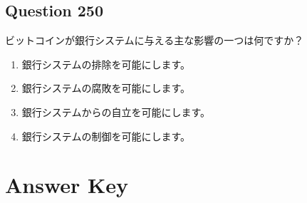 \documentclass[12pt,a4paper]{article}
\begin{document}
\subsection*{Question 250}
ビットコインが銀行システムに与える主な影響の一つは何ですか？

\begin{enumerate}[label=\Alph*., leftmargin=*]
\item 銀行システムの排除を可能にします。
\item 銀行システムの腐敗を可能にします。
\item 銀行システムからの自立を可能にします。
\item 銀行システムの制御を可能にします。
\end{enumerate}

\bigskip


\newpage
\section*{Answer Key}
\end{document}
